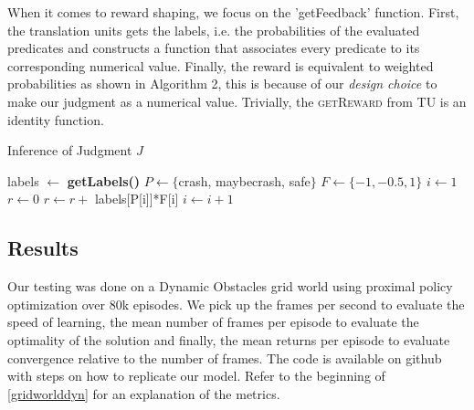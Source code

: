 When it comes to reward shaping, we focus on the 'getFeedback' function. First, the translation units gets 
the labels, i.e. the probabilities of the evaluated predicates and constructs a function that associates 
every predicate to its corresponding numerical value. Finally, the reward is equivalent to weighted probabilities 
as shown in Algorithm 2, this is because of our \emph{design choice} to make our judgment as a numerical value. 
Trivially, the \textsc{getReward} from TU is an identity function.

\begin{algorithm}[H]
  \caption{Inference of Judgment $J$}
  \begin{algorithmic}[1]
      
      \State labels $\gets$ \textbf{getLabels()} 
      \State $P \gets \{$crash, maybecrash, safe$\}$  
      \State $F \gets \{-1,-0.5,1\}$ 
      \State $i \gets 1$
      \State $r \gets 0$
         \State $r \gets r +$ labels[P[i]]*F[i] 
         \State $i \gets i+1$


      \EndWhile
      
      \EndProcedure
      
      \end{algorithmic}
      \end{algorithm}

    \subsection{Results}
    Our testing was done on a Dynamic Obstacles grid world using proximal policy optimization over 80k episodes. 
    We pick up the frames per second to evaluate the speed of learning, the mean number of frames per episode 
    to evaluate the optimality of the solution and finally, the mean returns per episode to evaluate convergence relative 
    to the number of frames. The code is available on github \cite{dio} with steps on how to replicate our model. 
    Refer to the beginning of \ref{gridworlddyn} for an explanation of the metrics. 


